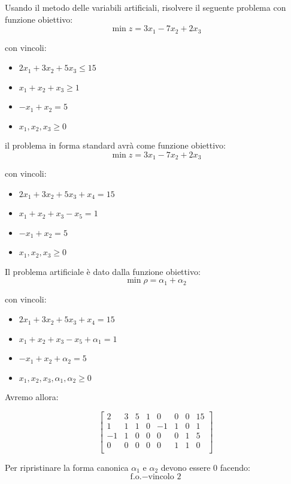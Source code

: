 Usando il metodo delle variabili artificiali, risolvere il seguente problema con funzione obiettivo:
$$\min z = 3x_1 - 7x_2 + 2x_3$$

con vincoli:

\begin{itemize}
	\item $2x_1 + 3x_2 + 5x_3 \leq 15$
	\item $x_1 + x_2 + x_3 \geq 1$
	\item $-x_1 + x_2 = 5$
	\item $x_1, x_2, x_3 \geq 0$
\end{itemize}

il problema in forma standard avrà come funzione obiettivo:
$$\min z = 3x_1 - 7x_2 + 2x_3$$

con vincoli:

\begin{itemize}
	\item $2x_1 + 3x_2 + 5x_3 + x_4 = 15$
	\item $x_1 + x_2 + x_3 - x_5 = 1$
	\item $-x_1 + x_2 = 5$
	\item $x_1, x_2, x_3 \geq 0$
\end{itemize}

Il problema artificiale è dato dalla funzione obiettivo:
$$\min \rho = \alpha_1 + \alpha_2$$

con vincoli:

\begin{itemize}
	\item $2x_1 + 3x_2 + 5x_3 + x_4 = 15$
	\item $x_1 + x_2 + x_3 - x_5 + \alpha_1 = 1$
	\item $-x_1 + x_2 + \alpha_2 = 5$
	\item $x_1, x_2, x_3, \alpha_1, \alpha_2 \geq 0$
\end{itemize}

Avremo allora:

$$
\left[ {\begin{array}{cccccccc}
	2 & 3 & 5 & 1 & 0 & 0 & 0 & 15\\
	1 & 1 & 1 & 0 & -1 & 1 & 0 & 1\\
	-1 & 1 & 0 & 0 & 0 & 0 & 1 & 5\\
	0 & 0 & 0 & 0 & 0 & 1 & 1 & 0\\
\end{array} } \right]
$$

Per ripristinare la forma canonica $\alpha_1$ e $\alpha_2$ devono essere $0$ facendo:
$$\text{f.o.} - \text{vincolo 2}$$

